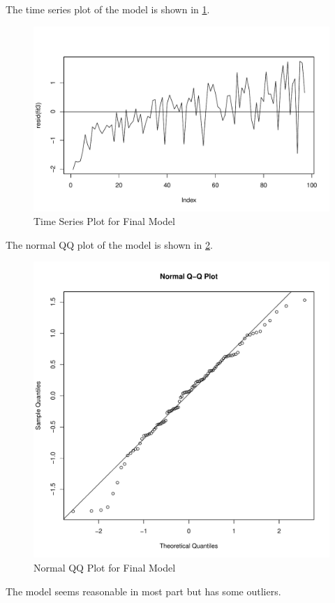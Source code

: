 \documentclass[12pt,letterpaper,titlepage,en-US]{article}
\begin{document}
The time series plot of the model is shown in \cref{timefit6}.
\begin{figure}[H]
    \centering
    \caption{Time Series Plot for Final Model}\label{timefit6}
    \includegraphics[width=.9\textwidth]{fig/plotfit6times.pdf}
\end{figure}

The normal QQ plot of the model is shown in \cref{qqfit6}.

\begin{figure}[H]
    \centering
    \caption{Normal QQ Plot for Final Model}\label{qqfit6}
    \includegraphics[width=.85\textwidth]{fig/qqnormplotfit6.pdf}
\end{figure}

The model seems reasonable in most part but has some outliers.
\end{document}
